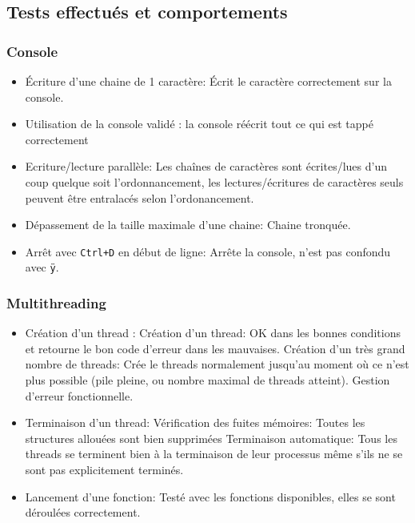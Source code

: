 \documentclass{article}
\begin{document}
	\subsection{Tests effectués et comportements}
		\subsubsection{Console}
			\begin{itemize}
				\item Écriture d'une chaine de 1 caractère: Écrit le caractère correctement sur la console.
				\item Utilisation de la console				validé : la console réécrit tout ce qui est tappé correctement
				\item Ecriture/lecture parallèle: Les chaînes de caractères sont écrites/lues d'un coup quelque soit l'ordonnancement, les lectures/écritures de caractères seuls peuvent être entralacés selon l'ordonancement.
				\item Dépassement de la taille maximale d'une chaine: Chaine tronquée.
				\item Arrêt avec \texttt{Ctrl+D} en début de ligne: Arrête la console, n'est pas confondu avec \texttt{ÿ}.
			\end{itemize}

		\subsubsection{Multithreading}
			\begin{itemize}
				\item Création d'un thread :
					\subitem Création d'un thread: OK dans les bonnes conditions et retourne le bon code d'erreur dans les mauvaises.
					\subitem Création d'un très grand nombre de threads: Crée le threads normalement jusqu'au moment où ce n'est plus possible (pile pleine, ou nombre maximal de threads atteint). Gestion d'erreur fonctionnelle.
				\item Terminaison d'un thread:
					\subitem Vérification des fuites mémoires: Toutes les structures allouées sont bien supprimées
					\subitem Terminaison automatique: Tous les threads se terminent bien à la terminaison de leur processus même s'ils ne se sont pas explicitement terminés.
				\item Lancement d'une fonction: Testé avec les fonctions disponibles, elles se sont déroulées correctement.
			\end{itemize}
\end{document}
